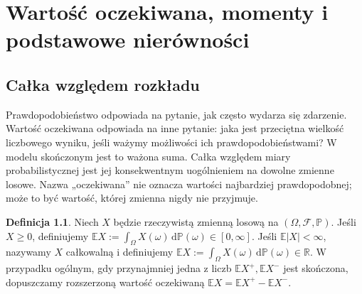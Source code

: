 \documentclass[11pt,a4paper,oneside]{report}
\numberwithin{equation}{chapter}
\theoremstyle{plain}
\theoremstyle{definition}
\newtheorem{definicja}{Definicja}[chapter]
\theoremstyle{remark}
\newcommand{\R}{\mathbb{R}}
\newcommand{\Prob}{\mathbb{P}}
\newcommand{\E}{\mathbb{E}}
\newcommand{\dd}{\mathrm{d}}
\begin{document}
\chapter{Wartość oczekiwana, momenty i podstawowe nierówności}
\label{ch:expectation}

\section{Całka względem rozkładu}
Prawdopodobieństwo odpowiada na pytanie, jak często wydarza się
zdarzenie. Wartość oczekiwana odpowiada na inne pytanie:
jaka jest przeciętna wielkość liczbowego wyniku, jeśli ważymy
możliwości ich prawdopodobieństwami? W modelu skończonym jest
to ważona suma. Całka względem miary probabilistycznej jest
jej konsekwentnym uogólnieniem na dowolne zmienne losowe.
Nazwa „oczekiwana” nie oznacza wartości najbardziej prawdopodobnej;
może to być wartość, której zmienna nigdy nie przyjmuje.

\begin{definicja}
Niech $X$ będzie rzeczywistą zmienną losową na
$(\Omega,\mathcal F,\Prob)$. Jeśli $X\geq0$, definiujemy
$\E X:=\int_\Omega X(\omega)\,\dd\Prob(\omega)\in[0,\infty]$.
Jeśli $\E|X|<\infty$, nazywamy $X$ całkowalną i definiujemy
$\E X:=\int_\Omega X(\omega)\,\dd\Prob(\omega)\in\R$.
W przypadku ogólnym, gdy przynajmniej jedna z liczb
$\E X^+,\E X^-$ jest skończona, dopuszczamy rozszerzoną
wartość oczekiwaną $\E X=\E X^+-\E X^-$.
\end{definicja}
\end{document}
